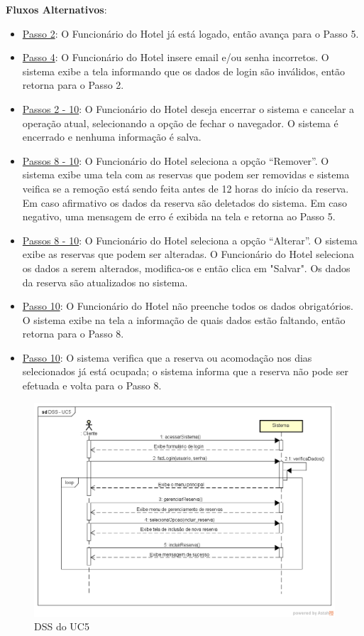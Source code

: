 \documentclass[notitlepage]{article}
\begin{document}
\textbf{Fluxos Alternativos}:\\
\begin{itemize}
\item \underline{Passo 2}: O Funcionário do Hotel já está logado, então avança para o Passo 5.
\item \underline{Passo 4}: O Funcionário do Hotel insere email e/ou senha incorretos. O sistema exibe a tela informando que os dados de login são inválidos, então retorna para o Passo 2.
\item \underline{Passos 2 - 10}: O Funcionário do Hotel deseja encerrar o sistema e cancelar a operação atual, selecionando a opção de fechar o navegador. O sistema é encerrado e nenhuma informação é salva.  
\item \underline{Passos 8 - 10}: O Funcionário do Hotel seleciona a opção “Remover”. O sistema exibe uma tela com as reservas que podem ser removidas e  sistema veifica se a remoção está sendo feita antes de 12 horas do início da reserva. Em caso afirmativo os dados da reserva são deletados do sistema. Em caso negativo, uma mensagem de erro é exibida na tela e retorna ao Passo 5.    
\item \underline{Passos 8 - 10}: O Funcionário do Hotel seleciona a opção “Alterar”. O sistema exibe as reservas que podem ser alteradas. O Funcionário do Hotel seleciona os dados a serem alterados, modifica-os e então clica em "Salvar". Os dados da reserva são atualizados no sistema. 
\item \underline{Passo 10}: O Funcionário do Hotel não preenche todos os dados obrigatórios. O sistema exibe na tela a informação de quais dados estão faltando, então retorna para o Passo 8.
\item \underline{Passo 10}: O sistema verifica que a reserva ou acomodação nos dias selecionados já está ocupada; o sistema informa que a reserva não pode ser efetuada e volta para o Passo 8.
\end{itemize}

\begin{figure}[!htbp]
	\centering
  \includegraphics[scale=0.65]{UC5.png}
  \caption{DSS do UC5}
  \label{fig:UC5}
\end{figure}
\end{document}

